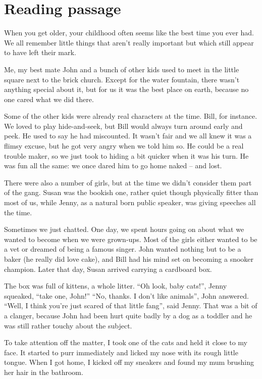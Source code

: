 \chapter{Reading passage}
\label{app.reading}
When you get older, your childhood often seems like the best time you ever had. We all remember little things that aren't really important but which still appear to have left their mark.

Me, my best mate John and a bunch of other kids used to meet in the little square next to the brick church. Except for the water fountain, there wasn't anything special about it, but for us it was the best place on earth, because no one cared what we did there.

Some of the other kids were already real characters at the time. Bill, for instance. We loved to play hide-and-seek, but Bill would always turn around early and peek. He used to say he had miscounted. It wasn't fair and we all knew it was a flimsy excuse, but he got very angry when we told him so. He could be a real trouble maker, so we just took to hiding a bit quicker when it was his turn. He was fun all the same: we once dared him to go home naked -- and lost.

There were also a number of girls, but at the time we didn't consider them part of the gang. Susan was the bookish one, rather quiet though physically fitter than most of us, while Jenny, as a natural born public speaker, was giving speeches all the time.

Sometimes we just chatted. One day, we spent hours going on about what we wanted to become when we were grown-ups. Most of the girls either wanted to be a vet or dreamed of being a famous singer. John wanted nothing but to be a baker (he really did love cake), and Bill had his mind set on becoming a snooker champion.
Later that day, Susan arrived carrying a cardboard box.

The box was full of kittens, a whole litter. ``Oh look, baby cats!'', Jenny squeaked, ``take one, John!'' ``No, thanks. I don't like animals'', John answered. ``Well, I think you're just scared of that little fang'', said Jenny. That was a bit of a clanger, because John had been hurt quite badly by a dog as a toddler and he was still rather touchy about the subject.

To take attention off the matter, I took one of the cats and held it close to my face. It started to purr immediately and licked my nose with its rough little tongue.
When I got home, I kicked off my sneakers and found my mum brushing her hair in the bathroom.


